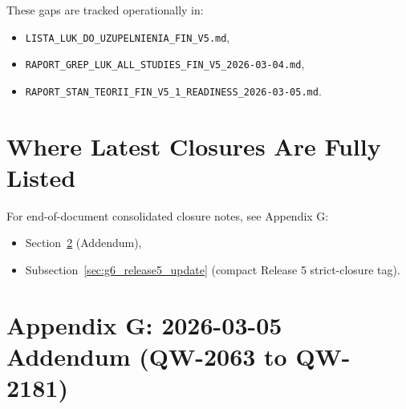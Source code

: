 \documentclass[11pt,a4paper]{article}
\begin{document}
These gaps are tracked operationally in:
\begin{itemize}[leftmargin=1.4em]
    \item \texttt{LISTA\_LUK\_DO\_UZUPELNIENIA\_FIN\_V5.md},
    \item \texttt{RAPORT\_GREP\_LUK\_ALL\_STUDIES\_FIN\_V5\_2026-03-04.md},
    \item \texttt{RAPORT\_STAN\_TEORII\_FIN\_V5\_1\_READINESS\_2026-03-05.md}.
\end{itemize}

\section{Where Latest Closures Are Fully Listed}
For end-of-document consolidated closure notes, see Appendix G:
\begin{itemize}[leftmargin=1.4em]
    \item Section~\ref{sec:addendum_latest_closure} (Addendum),
    \item Subsection~\ref{sec:g6_release5_update} (compact Release 5 strict-closure tag).
\end{itemize}

\appendix

\section{Appendix G: 2026-03-05 Addendum (QW-2063 to QW-2181)}
\label{sec:addendum_latest_closure}
\end{document}
